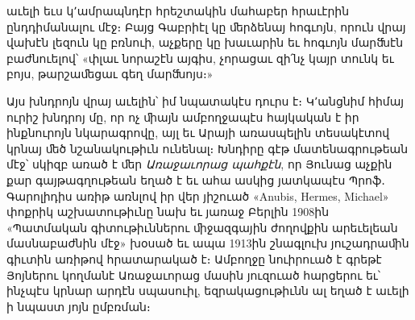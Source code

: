\documentclass{article}
\begin{document}
{աւելի եւս կ՚ամրապնդէր հրեշտակին մահաբեր հրաւէրին ընդդիմանալու մէջ։ Բայց Գաբրիէլ կը ﬔրձենայ հոգւոյն, որուն վրայ վախէն լեզուն կը բռնուի, աչքերը կը խաւարին եւ հոգւոյն մարﬓէն բաժնուելով՝ «փլաւ նորաշէն այգիս, չորացաւ զի՛նչ կայր տունկ եւ բոյս, թարշաﬔցաւ գեղ մարﬓոյս։»

Այս խնդրոյն վրայ աւելին՝ իմ նպատակէս դուրս է։ Կ՚անցնիմ հիմայ ուրիշ խնդրոյ մը, որ ոչ ﬕայն ամբողջապէս հայկական է իր ինքնուրոյն նկարագրովը, այլ եւ Արայի առասպելին տեսակէտով կրնայ ﬔծ նշանակութիւն ունենալ։ Խնդիրը գէթ մատենագրութեան մէջ՝ սկիզբ առած է ﬔր \emph{Առաջաւորաց պահքէն}, որ Յունաց աչքին քար գայթագղութեան եղած է եւ ահա ասկից յատկապէս Պրոֆ․ Գարոլիդիս առիթ առնլով իր վեր յիշուած «Anubis, Hermes, Michael» փոքրիկ աշխատութիւնը նախ եւ յառաջ Բերլին 1908ին «Պատմական գիտութիւններու ﬕջազգային ժողովքին արեւելեան մասնաբաժնին մէջ» խօսած եւ ապա 1913ին շնագլուխ յուշադրաﬕն գիւտին առիթով հրատարակած է։ Ամբողջը նուիրուած է գրեթէ Յոյներու կողմանէ Առաջաւորաց մասին յուզուած հարցերու եւ՝ ինչպէս կրնար արդէն սպասուիլ, եզրակացութիւնն ալ եղած է աւելի ի նպաստ յոյն ըմբռման։

}
\end{document}
